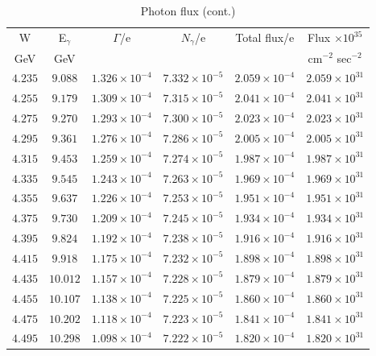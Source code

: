 \documentclass[12pt]{revtex4}
\begin{document}
\begin{table}[htdp]
\caption{Photon flux (cont.)}
\begin{center}
\small{
\begin{tabular}{|c|c|c|c|c|c|}
\hline
W &  E$_\gamma$&$\Gamma$/e &$N_\gamma$/e &Total flux/e &  Flux $\times 10^{35}$ \\ 
GeV &GeV&&&& cm$^{-2}$ sec$^{-2}$ \\ \hline
$4.235$ &   $9.088$ & $1.326\times 10^{-4}$ & $7.332\times 10^{-5}$ & $2.059\times 10^{-4}$ & $2.059\times 10^{31}$\\ \hline
$4.255$ &   $9.179$ & $1.309\times 10^{-4}$ & $7.315\times 10^{-5}$ & $2.041\times 10^{-4}$ & $2.041\times 10^{31}$\\ \hline
$4.275$ &   $9.270$ & $1.293\times 10^{-4}$ & $7.300\times 10^{-5}$ & $2.023\times 10^{-4}$ & $2.023\times 10^{31}$\\ \hline
$4.295$ &   $9.361$ & $1.276\times 10^{-4}$ & $7.286\times 10^{-5}$ & $2.005\times 10^{-4}$ & $2.005\times 10^{31}$\\ \hline
$4.315$ &   $9.453$ & $1.259\times 10^{-4}$ & $7.274\times 10^{-5}$ & $1.987\times 10^{-4}$ & $1.987\times 10^{31}$\\ \hline
$4.335$ &   $9.545$ & $1.243\times 10^{-4}$ & $7.263\times 10^{-5}$ & $1.969\times 10^{-4}$ & $1.969\times 10^{31}$\\ \hline
$4.355$ &   $9.637$ & $1.226\times 10^{-4}$ & $7.253\times 10^{-5}$ & $1.951\times 10^{-4}$ & $1.951\times 10^{31}$\\ \hline
$4.375$ &   $9.730$ & $1.209\times 10^{-4}$ & $7.245\times 10^{-5}$ & $1.934\times 10^{-4}$ & $1.934\times 10^{31}$\\ \hline
$4.395$ &   $9.824$ & $1.192\times 10^{-4}$ & $7.238\times 10^{-5}$ & $1.916\times 10^{-4}$ & $1.916\times 10^{31}$\\ \hline
$4.415$ &   $9.918$ & $1.175\times 10^{-4}$ & $7.232\times 10^{-5}$ & $1.898\times 10^{-4}$ & $1.898\times 10^{31}$\\ \hline
$4.435$ &  $10.012$ & $1.157\times 10^{-4}$ & $7.228\times 10^{-5}$ & $1.879\times 10^{-4}$ & $1.879\times 10^{31}$\\ \hline
$4.455$ &  $10.107$ & $1.138\times 10^{-4}$ & $7.225\times 10^{-5}$ & $1.860\times 10^{-4}$ & $1.860\times 10^{31}$\\ \hline
$4.475$ &  $10.202$ & $1.118\times 10^{-4}$ & $7.223\times 10^{-5}$ & $1.841\times 10^{-4}$ & $1.841\times 10^{31}$\\ \hline
$4.495$ &  $10.298$ & $1.098\times 10^{-4}$ & $7.222\times 10^{-5}$ & $1.820\times 10^{-4}$ & $1.820\times 10^{31}$\\ \hline

\end{tabular}}
\end{center}
\end{table}
\end{document}
